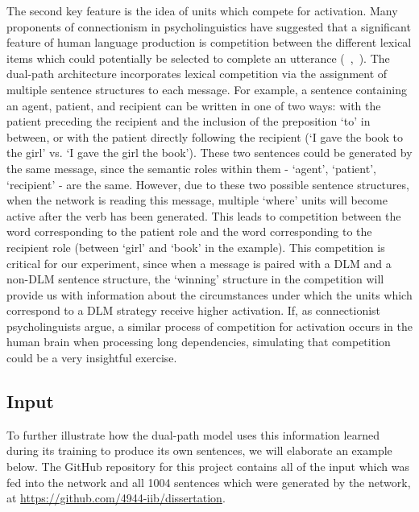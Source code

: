 \documentclass{article}
\begin{document}
The second key feature is the idea of units which compete for activation. Many proponents of connectionism in psycholinguistics have suggested that a significant feature of human language production is competition between the different lexical items which could potentially be selected to complete an utterance (\!~\cite{plaut1999},~\cite{gordon2003}). The dual-path architecture incorporates lexical competition via the assignment of multiple sentence structures to each message. For example, a sentence containing an agent, patient, and recipient can be written in one of two ways: with the patient preceding the recipient and the inclusion of the preposition `to' in between, or with the patient directly following the recipient (`I gave the book to the girl' vs. `I gave the girl the book'). These two sentences could be generated by the same message, since the semantic roles within them - `agent', `patient', `recipient' - are the same. However, due to these two possible sentence structures, when the network is reading this message, multiple `where' units will become active after the verb has been generated. This leads to competition between the word corresponding to the patient role and the word corresponding to the recipient role (between `girl' and `book' in the example). This competition is critical for our experiment, since when a message is paired with a DLM and a non-DLM sentence structure, the `winning' structure in the competition will provide us with information about the circumstances under which the units which correspond to a DLM strategy receive higher activation. If, as connectionist psycholinguists argue, a similar process of competition for activation occurs in the human brain when processing long dependencies, simulating that competition could be a very insightful exercise.

\subsection{Input}
To further illustrate how the dual-path model uses this information learned during its training to produce its own sentences, we will elaborate an example below. The GitHub repository for this project contains all of the input which was fed into the network and all 1004 sentences which were generated by the network, at \url{https://github.com/4944-iib/dissertation}. 
\end{document}
